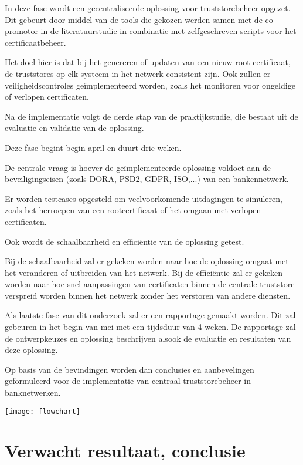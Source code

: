 In deze fase wordt een gecentraliseerde oplossing voor truststorebeheer opgezet. Dit gebeurt door middel van de tools die gekozen werden samen met de co-promotor in de literatuurstudie in combinatie met zelfgeschreven scripts voor het certificaatbeheer.

Het doel hier is dat bij het genereren of updaten van een nieuw root certificaat, de truststores op elk systeem in het netwerk consistent zijn. Ook zullen er veiligheidscontroles geïmplementeerd worden, zoals het monitoren voor ongeldige of verlopen certificaten.

Na de implementatie volgt de derde stap van de praktijkstudie, die bestaat uit de evaluatie en validatie van de oplossing.

Deze fase begint begin april en duurt drie weken.

De centrale vraag is hoever de geïmplementeerde oplossing voldoet aan de beveiligingseisen (zoals DORA, PSD2, GDPR, ISO,...) van een bankennetwerk.

Er worden testcases opgesteld om veelvoorkomende uitdagingen te simuleren, zoals het herroepen van een rootcertificaat of het omgaan met verlopen certificaten.

Ook wordt de schaalbaarheid en efficiëntie van de oplossing getest.

Bij de schaalbaarheid zal er gekeken worden naar hoe de oplossing omgaat met het veranderen of uitbreiden van het netwerk. Bij de efficiëntie zal er gekeken worden naar hoe snel aanpassingen van certificaten binnen de centrale truststore verspreid worden binnen het netwerk zonder het verstoren van andere diensten.

Als laatste fase van dit onderzoek zal er een rapportage gemaakt worden. Dit zal gebeuren in het begin van mei met een tijdsduur van 4 weken. De rapportage zal de ontwerpkeuzes en oplossing beschrijven alsook de evaluatie en resultaten van deze oplossing.

Op basis van de bevindingen worden dan conclusies en aanbevelingen geformuleerd voor de implementatie van centraal truststorebeheer in banknetwerken. 

\begin{center}
    \texttt{[image: flowchart]}
\end{center}

\section{Verwacht resultaat, conclusie}%
\label{sec:verwachte_resultaten}


